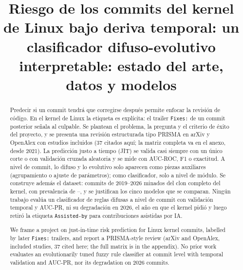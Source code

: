 \documentclass[conference,letterpaper]{IEEEtran}
\begin{document}
\title{Riesgo de los commits del kernel de Linux bajo deriva temporal: un clasificador difuso-evolutivo interpretable: estado del arte, datos y modelos}

\author{
}

\maketitle

\begin{abstract}
Predecir si un commit tendrá que corregirse después permite enfocar la revisión de código. En el kernel de Linux la etiqueta es explícita: el trailer \texttt{Fixes:} de un commit posterior señala al culpable. Se plantean el problema, la pregunta y el criterio de éxito del proyecto, y se presenta una revisión estructurada tipo PRISMA en arXiv y OpenAlex con \nTotalIncluidos{} estudios incluidos (37 citados aquí; la matriz completa va en el anexo, \nRecientes{} desde 2021). La predicción justo a tiempo (JIT) se valida casi siempre con un único corte o con validación cruzada aleatoria y se mide con AUC-ROC, F1 o exactitud. A nivel de commit, lo difuso y lo evolutivo solo aparecen como piezas auxiliares (agrupamiento o ajuste de parámetros); como clasificador, solo a nivel de módulo. Se construye además el dataset: \cifCommits{} commits de 2019--2026 minados del clon completo del kernel, con prevalencia de \cifPrevMin{}--\cifPrevMax{}, y se justifican los cinco modelos que se comparan. Ningún trabajo evalúa un clasificador de reglas difusas a nivel de commit con validación temporal y AUC-PR, ni su degradación en 2026, el año en que el kernel pidió y luego retiró la etiqueta \texttt{Assisted-by} para contribuciones asistidas por IA.
\end{abstract}

\begingroup\renewcommand{\abstractname}{Abstract}
\begin{abstract}
We frame a project on just-in-time risk prediction for Linux kernel commits, labelled by later \texttt{Fixes:} trailers, and report a PRISMA-style review (arXiv and OpenAlex, \nTotalIncluidos{} included studies, 37 cited here; the full matrix is in the appendix). No prior work evaluates an evolutionarily tuned fuzzy rule classifier at commit level with temporal validation and AUC-PR, nor its degradation on 2026 commits.
\end{abstract}\endgroup
\end{document}
